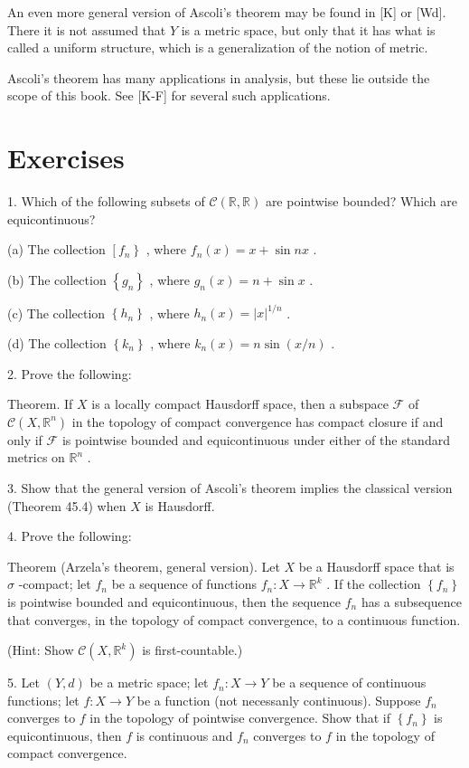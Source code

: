 \documentclass[10pt]{article}
\begin{document}
An even more general version of Ascoli's theorem may be found in [K] or [Wd]. There it is not assumed that \(Y\) is a metric space, but only that it has what is called a uniform structure, which is a generalization of the notion of metric.

Ascoli's theorem has many applications in analysis, but these lie outside the scope of this book. See [K-F] for several such applications.

\section*{Exercises}

1. Which of the following subsets of \(\mathcal{C}\left( {\mathbb{R},\mathbb{R}}\right)\) are pointwise bounded? Which are equicontinuous?

(a) The collection \(\left\lbrack  {f}_{n}\right\}\) , where \({f}_{n}\left( x\right)  = x + \sin {nx}\) .

(b) The collection \(\left\{  {g}_{n}\right\}\) , where \({g}_{n}\left( x\right)  = n + \sin x\) .

(c) The collection \(\left\{  {h}_{n}\right\}\) , where \({h}_{n}\left( x\right)  = {\left| x\right| }^{1/n}\) .

(d) The collection \(\left\{  {k}_{n}\right\}\) , where \({k}_{n}\left( x\right)  = n\sin \left( {x/n}\right)\) .

2. Prove the following:

Theorem. If \(X\) is a locally compact Hausdorff space, then a subspace \(\mathcal{F}\) of \(\mathcal{C}\left( {X,{\mathbb{R}}^{n}}\right)\) in the topology of compact convergence has compact closure if and only if \(\mathcal{F}\) is pointwise bounded and equicontinuous under either of the standard metrics on \({\mathbb{R}}^{n}\) .

3. Show that the general version of Ascoli's theorem implies the classical version (Theorem 45.4) when \(X\) is Hausdorff.

4. Prove the following:

Theorem (Arzela's theorem, general version). Let \(X\) be a Hausdorff space that is \(\sigma\) -compact; let \({f}_{n}\) be a sequence of functions \({f}_{n} : X \rightarrow  {\mathbb{R}}^{k}\) . If the collection \(\left\{  {f}_{n}\right\}\) is pointwise bounded and equicontinuous, then the sequence \({f}_{n}\) has a subsequence that converges, in the topology of compact convergence, to a continuous function.

(Hint: Show \(\mathcal{C}\left( {X,{\mathbb{R}}^{k}}\right)\) is first-countable.)

5. Let \(\left( {Y,d}\right)\) be a metric space; let \({f}_{n} : X \rightarrow  Y\) be a sequence of continuous functions; let \(f : X \rightarrow  Y\) be a function (not necessanly continuous). Suppose \({f}_{n}\) converges to \(f\) in the topology of pointwise convergence. Show that if \(\left\{  {f}_{n}\right\}\) is equicontinuous, then \(f\) is continuous and \({f}_{n}\) converges to \(f\) in the topology of compact convergence.
\end{document}
